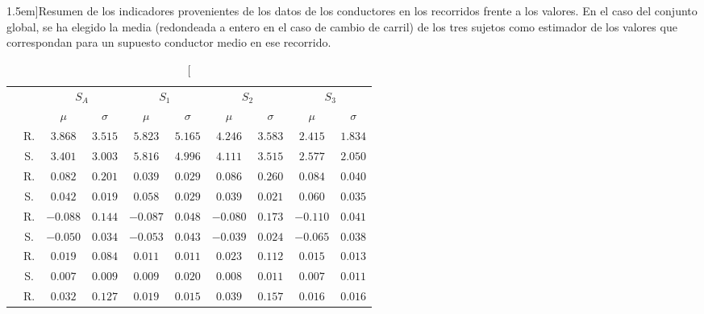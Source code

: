 \begin{table*}
	\centering
	\caption[Indicadores reales frente a indicadores capturados en simulación][1.5em]{Resumen de los indicadores provenientes de los datos de los conductores en los recorridos frente a los valores. En el caso del conjunto global, se ha elegido la media (redondeada a entero en el caso de cambio de carril) de los tres sujetos como estimador de los valores que correspondan para un supuesto conductor medio en ese recorrido.}
	\label{tbl:global-comparison-indicators}
	\begin{tabular}{cccccccccc}
		\toprule
		&                   & \multicolumn{2}{c}{$S_A$}    & \multicolumn{2}{c}{$S_1$}          & \multicolumn{2}{c}{$S_2$}        & \multicolumn{2}{c}{\textbf{$S_3$}}        \\
		\multicolumn{2}{l}{}                  & $\mu$     & $\sigma$ & $\mu$    & $\sigma$ & $\mu$     & $\sigma$  & $\mu$    & $\sigma$ \\
		\midrule
		\rowcolor{black!20} \cellcolor{white} \multirow{2}{*}{\textbf{$V$}}   & R. & $3.868$  & $3.515$  & $5.823$  & $5.165$  & $4.246$  & $3.583$  & $2.415$  & $1.834$  \\
		                                & S. & $3.401$  & $3.003$  & $5.816$  & $4.996$  & $4.111$  & $3.515$  & $2.577$  & $2.050$  \\
		\rowcolor{black!20} \cellcolor{white} \multirow{2}{*}{\textbf{$AP$}}  & R. & $0.082$  & $0.201$  & $0.039$  & $0.029$  & $0.086$  & $0.260$  & $0.084$  & $0.040$  \\
		                                & S. & $0.042$  & $0.019$  & $0.058$  & $0.029$  & $0.039$  & $0.021$  & $0.060$  & $0.035$  \\
		\rowcolor{black!20} \cellcolor{white} \multirow{2}{*}{\textbf{$AN$}}  & R. & $-0.088$ & $0.144$  & $-0.087$ & $0.048$  & $-0.080$ & $0.173$  & $-0.110$ & $0.041$  \\
		                                & S. & $-0.050$ & $0.034$  & $-0.053$ & $0.043$  & $-0.039$ & $0.024$  & $-0.065$ & $0.038$  \\
		\rowcolor{black!20} \cellcolor{white} \multirow{2}{*}{\textbf{$JIM$}} & R. & $0.019$  & $0.084$  & $0.011$  & $0.011$  & $0.023$  & $0.112$  & $0.015$  & $0.013$  \\
		                                & S. & $0.007$  & $0.009$  & $0.009$  & $0.020$  & $0.008$  & $0.011$  & $0.007$  & $0.011$  \\
		\rowcolor{black!20} \cellcolor{white} \multirow{2}{*}{\textbf{$JLC$}} & R. & $0.032$  & $0.127$  & $0.019$  & $0.015$  & $0.039$  & $0.157$  & $0.016$  & $0.016$  \\

\end{tabular}
\end{table*}
